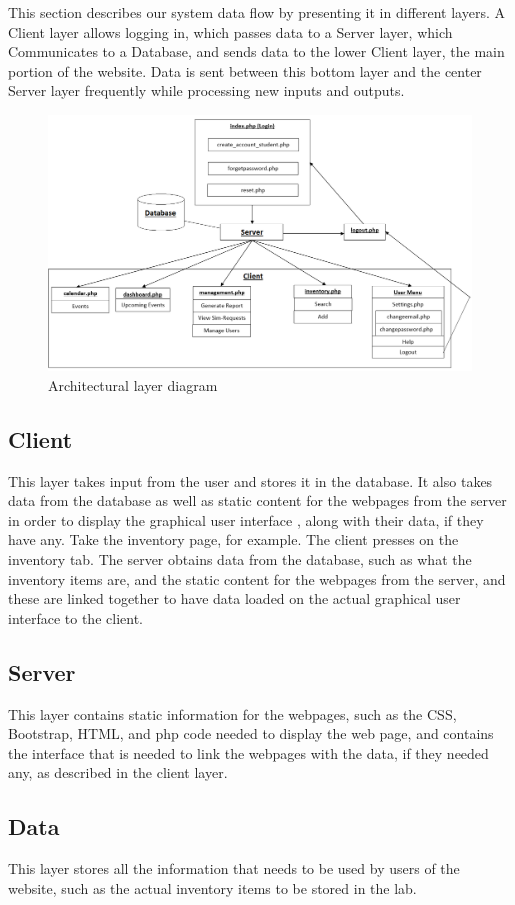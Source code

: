This section describes our system data flow by presenting it in different layers. A Client layer allows logging in, which passes data to a Server layer, which Communicates to a Database, and sends data to the lower Client layer, the main portion of the website. Data is sent between this bottom layer and the center Server layer frequently while processing new inputs and outputs.

\begin{figure}[h!]
	\centering
 	\includegraphics[width=1.0\textwidth]{images/systemoverview}
 \caption{Architectural layer diagram}
\end{figure}

\subsection{Client}
This layer takes input from the user and stores it in the database. It also takes data from the database as well as static content for the webpages from the server in order to display the graphical user interface , along with their data, if they have any. Take the inventory page, for example. The client presses on the inventory tab. The server obtains data from the database, such as what the inventory items are, and the static content for the webpages from the server, and these are linked together to have data loaded on the actual graphical user interface to the client. 

\subsection{Server}
This layer contains static information for the webpages, such as the CSS, Bootstrap, HTML, and php code needed to display the web page, and contains the interface that is needed to link the webpages with the data, if they needed any, as described in the client layer.

\subsection{Data}
This layer stores all the information that needs to be used by users of the website, such as the actual inventory items to be stored in the lab. 